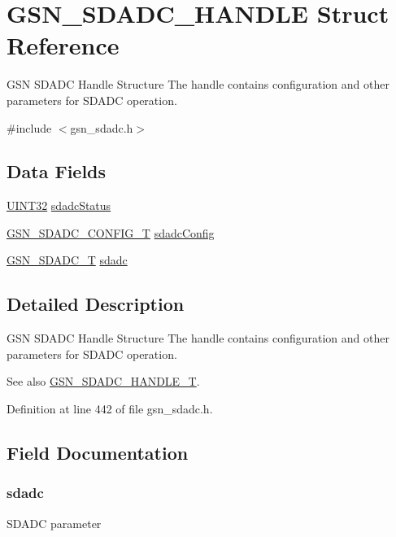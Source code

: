 \hypertarget{a00214}{
\section{GSN\_\-SDADC\_\-HANDLE Struct Reference}
\label{a00214}
}


GSN SDADC Handle Structure The handle contains configuration and other parameters for SDADC operation.  




{\ttfamily \#include $<$gsn\_\-sdadc.h$>$}

\subsection*{Data Fields}
\begin{DoxyCompactItemize}
\item 
\hyperlink{a00660_gae1e6edbbc26d6fbc71a90190d0266018}{UINT32} \hyperlink{a00214_a4be1cc896c0c806c1ceda03b00446e5d}{sdadcStatus}
\item 
\hyperlink{a00213}{GSN\_\-SDADC\_\-CONFIG\_\-T} \hyperlink{a00214_adbf974f7628c19791be5104a729c530f}{sdadcConfig}
\item 
\hyperlink{a00212}{GSN\_\-SDADC\_\-T} \hyperlink{a00214_a08ff11abbf23363ec3eae3a53d6d2aec}{sdadc}
\end{DoxyCompactItemize}


\subsection{Detailed Description}
GSN SDADC Handle Structure The handle contains configuration and other parameters for SDADC operation. 

\begin{DoxySeeAlso}{See also}
\hyperlink{a00652_ga1c9d36e9faa624275bd36abfa94ac41f}{GSN\_\-SDADC\_\-HANDLE\_\-T}. 
\end{DoxySeeAlso}


Definition at line 442 of file gsn\_\-sdadc.h.



\subsection{Field Documentation}
\hypertarget{a00214_a08ff11abbf23363ec3eae3a53d6d2aec}{
\subsubsection[{sdadc}]{ {\bf sdadc}}}
\label{a00214_a08ff11abbf23363ec3eae3a53d6d2aec}
SDADC parameter 

